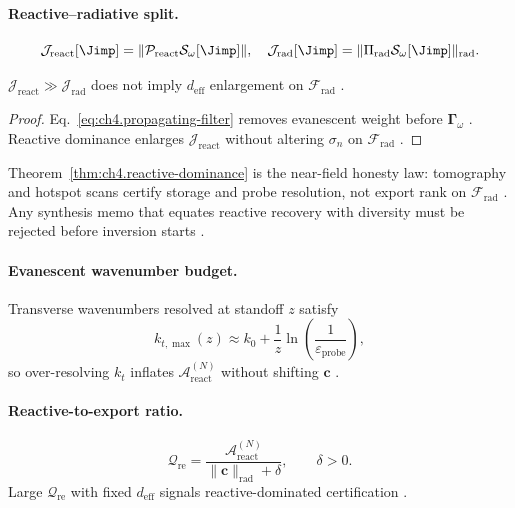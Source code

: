 \paragraph{Reactive--radiative split.}
\begin{equation}
\label{eq:ch4.reactive-radiative-split}
\mathcal{J}_{\mathrm{react}}[\Jimp]=\|\mathcal{P}_{\mathrm{react}}\mathcal{S}_\omega[\Jimp]\|,\quad
\mathcal{J}_{\mathrm{rad}}[\Jimp]=\|\Pi_{\mathrm{rad}}\mathcal{S}_\omega[\Jimp]\|_{\mathrm{rad}}.
\end{equation}
\begin{theorem}
\label{thm:ch4.reactive-dominance}
\(\mathcal{J}_{\mathrm{react}}\gg\mathcal{J}_{\mathrm{rad}}\) does not imply \(d_{\mathrm{eff}}\) enlargement on \(\mathcal{F}_{\mathrm{rad}}\)
\cite{stratton1941,harrington2001,devaney2004}.
\end{theorem}
\begin{proof}
Eq.~\eqref{eq:ch4.propagating-filter} removes evanescent weight before \(\boldsymbol{\Gamma}_\omega\) \cite{stratton1941,harrington2001}. Reactive
dominance enlarges \(\mathcal{J}_{\mathrm{react}}\) without altering \(\sigma_{n}\) on \(\mathcal{F}_{\mathrm{rad}}\) \cite{devaney2004,hansen1988}.
\end{proof}

Theorem~\ref{thm:ch4.reactive-dominance} is the near-field honesty law: tomography and hotspot scans certify storage and probe resolution, not export
rank on \(\mathcal{F}_{\mathrm{rad}}\) \cite{stratton1941,harrington2001,jackson1999}. Any synthesis memo that equates reactive recovery with diversity
must be rejected before inversion starts \cite{devaney2004,hansen1988}.

\paragraph{Evanescent wavenumber budget.}
Transverse wavenumbers resolved at standoff \(z\) satisfy
\begin{equation}
\label{eq:ch4.ev-wavenumber-budget}
k_{t,\max}(z)\approx k_{0}+\frac{1}{z}\ln\!\left(\frac{1}{\varepsilon_{\mathrm{probe}}}\right),
\end{equation}
so over-resolving \(k_{t}\) inflates \(\mathcal{A}_{\mathrm{react}}^{(N)}\) without shifting \(\mathbf{c}\) \cite{jackson1999,hansen1988,harrington2001,devaney2004}.

\paragraph{Reactive-to-export ratio.}
\begin{equation}
\label{eq:ch4.react-export-ratio}
\mathcal{Q}_{\mathrm{re}}=\frac{\mathcal{A}_{\mathrm{react}}^{(N)}}{\|\mathbf{c}\|_{\mathrm{rad}}+\delta},\qquad \delta>0.
\end{equation}
Large \(\mathcal{Q}_{\mathrm{re}}\) with fixed \(d_{\mathrm{eff}}\) signals reactive-dominated certification \cite{harrington2001,devaney2004,hansen1988,jackson1999}.

